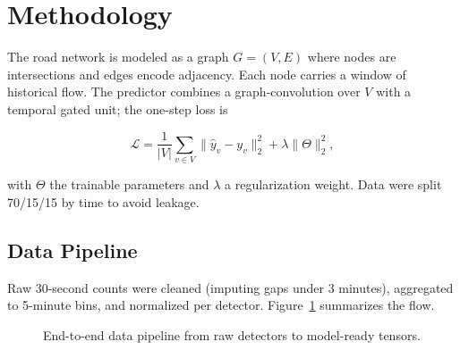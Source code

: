\section{Methodology}
The road network is modeled as a graph $G=(V,E)$ where nodes are intersections and edges
encode adjacency. Each node carries a window of historical flow. The predictor combines a
graph-convolution over $V$ with a temporal gated unit; the one-step loss is

\begin{equation}
\mathcal{L}=\frac{1}{|V|}\sum_{v\in V}\bigl\lVert \hat{y}_v - y_v\bigr\rVert_2^2
           +\lambda\lVert\Theta\rVert_2^2,
\end{equation}

with $\Theta$ the trainable parameters and $\lambda$ a regularization weight. Data were
split 70/15/15 by time to avoid leakage.

\subsection{Data Pipeline}
Raw 30-second counts were cleaned (imputing gaps under 3 minutes), aggregated to 5-minute
bins, and normalized per detector. Figure~\ref{fig:pipe} summarizes the flow.

\begin{figure}[ht]\centering
{}
\caption{End-to-end data pipeline from raw detectors to model-ready tensors.}
\label{fig:pipe}
\end{figure}
